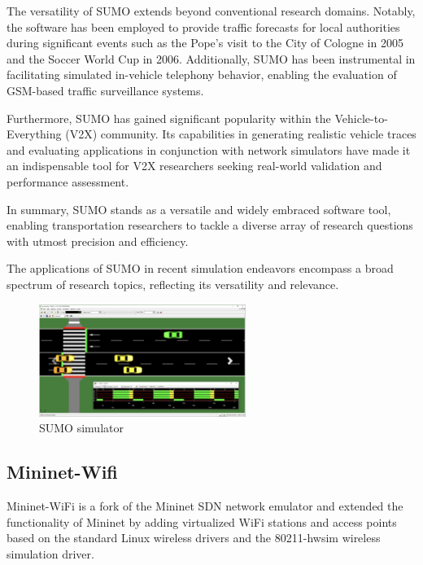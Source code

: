 \documentclass[
  oneside,
  11pt, a4paper,
  footinclude=true,
  headinclude=true,
  cleardoublepage=empty
]{scrbook}
\begin{document}
The versatility of SUMO extends beyond conventional research domains. Notably, the software has been employed to provide traffic forecasts for local authorities during significant events such as the Pope's visit to the City of Cologne in 2005 and the Soccer World Cup in 2006. Additionally, SUMO has been instrumental in facilitating simulated in-vehicle telephony behavior, enabling the evaluation of GSM-based traffic surveillance systems.

Furthermore, SUMO has gained significant popularity within the Vehicle-to-Everything (V2X) community. Its capabilities in generating realistic vehicle traces and evaluating applications in conjunction with network simulators have made it an indispensable tool for V2X researchers seeking real-world validation and performance assessment.

In summary, SUMO stands as a versatile and widely embraced software tool, enabling transportation researchers to tackle a diverse array of research questions with utmost precision and efficiency. 


The applications of SUMO in recent simulation endeavors encompass a broad spectrum of research topics, reflecting its versatility and relevance. 

\begin{figure}[H]
\begin{center}
  \includegraphics[width=0.6\textwidth]{img/sumo.png}
\end{center}
  \caption{SUMO simulator}
  \centering  
\label{sumo}
\end{figure}


\subsection{Mininet-Wifi}
\label{Mininet-Wifi}

Mininet-WiFi is a fork of the Mininet SDN network emulator and extended the functionality of Mininet by adding virtualized WiFi stations and access points based on the standard Linux wireless drivers and the 80211-hwsim wireless simulation driver. 
\end{document}

